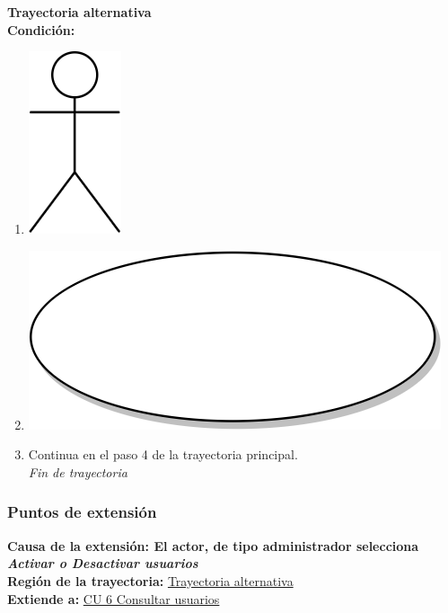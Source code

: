 \textbf{Trayectoria alternativa} \label{cu_ta_} \\
\textbf{Condición:} \\
 \begin{enumerate}[label=\arabic*]
    \item {\includegraphics[scale=.1]{Capitulo3/img/actor.png} }
    \item {\includegraphics[scale=.05]{Capitulo3/img/proceso.png}}
    \item {Continua en el paso 4 de la trayectoria principal.} \\
    \textit{Fin de trayectoria} \\
\end{enumerate}

\subsubsection{Puntos de extensión}
\noindent \textbf{Causa de la extensión: El actor, de tipo administrador selecciona \textit{Activar o Desactivar usuarios} } \\
\textbf{Región de la trayectoria:} \hyperref[cu_ta_]{Trayectoria alternativa } \\
\textbf{Extiende a:} \hyperref[cu6]{CU 6 Consultar usuarios}
